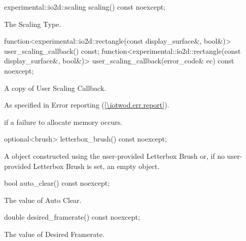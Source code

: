 \begin{itemdecl}
experimental::io2d::scaling scaling() const noexcept;
\end{itemdecl}
\begin{itemdescr}
\pnum
\returns
The Scaling Type.
\end{itemdescr}

\begin{itemdecl}
function<experimental::io2d::rectangle(const display_surface&, bool&)>
  user_scaling_callback() const;
function<experimental::io2d::rectangle(const display_surface&, bool&)>
  user_scaling_callback(error_code& ec) const noexcept;
\end{itemdecl}
\begin{itemdescr}
\pnum
\returns
A copy of User Scaling Callback.

\pnum
\throws
As specified in Error reporting (\ref{\iotwod.err.report}).

\pnum
\errors
{} if a failure to allocate memory occurs.
\end{itemdescr}

\begin{itemdecl}
optional<brush> letterbox_brush() const noexcept;
\end{itemdecl}
\begin{itemdescr}
\pnum
\returns
A  object constructed using the user-provided Letterbox Brush or, if no user-provided Letterbox Brush is set, an empty  object.
\end{itemdescr}

\begin{itemdecl}
bool auto_clear() const noexcept;
\end{itemdecl}
\begin{itemdescr}
\pnum
\returns
The value of Auto Clear.
\end{itemdescr}

\begin{itemdecl}
double desired_framerate() const noexcept;
\end{itemdecl}
\begin{itemdescr}
\pnum
\returns
The value of Desired Framerate.
\end{itemdescr}

